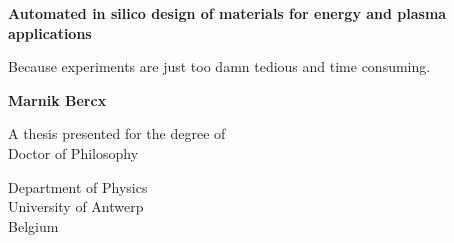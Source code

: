 \documentclass[11pt, a4paper]{book}
\begin{document}
\begin{titlepage}
   \begin{center}
       \vspace*{1cm}
 
       \textbf{Automated in silico design of materials for energy and plasma applications}
 
       \vspace{0.5cm}
        Because experiments are just too damn tedious and time consuming.
 
       \vspace{1.5cm}
 
       \textbf{Marnik Bercx}
 
       \vfill
 
       A thesis presented for the degree of\\
       Doctor of Philosophy
 
       \vspace{0.8cm}
 
       Department of Physics\\
       University of Antwerp\\
       Belgium\\
 
   \end{center}
\end{titlepage}

\tableofcontents

\newpage

\mainmatter








\appendix


\end{document}
